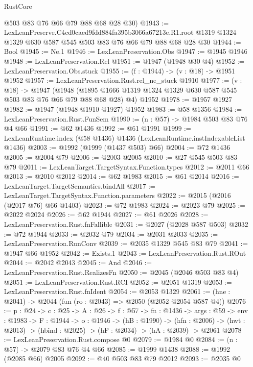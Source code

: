 \begin{lexlean}{RustCore}
\begin{coremodule}
      @503
      @83
      @76
      @66
      @79
      @88
      @68
      @28
      @30)
@1943 := LexLeanPreserve.C4cd0caed9fdd884fa395b3066a67213e.R1.root
    @1319
    @1324
    @1329
    @630
    @587
    @545
    @503
    @83
    @76
    @66
    @79
    @88
    @68
    @28
    @30
@1944 := Bool
@1945 := Ne.{1}
@1946 := LexLeanPreservation.Obs
@1947 := @1945 @1946
@1948 := LexLeanPreservation.Rel
@1951 := @1947 (@1948 @30 @4)
@1952 := LexLeanPreservation.Obs.stuck
@1955 := (f : @1944) -> (v : @18) -> @1951 @1952
@1957 := LexLeanPreservation.Rust.rel_ne_stuck @1910
@1977 := (v : @18) ->
  @1947
    (@1948 (@1895 @1666 @1319 @1324 @1329 @630 @587 @545 @503 @83 @76 @66 @79 @88 @68 @28) @4)
    @1952
@1978 := @1957 @1927
@1982 := @1947 (@1948 @1910 @1927) @1952
@1983 := @58 @1356
@1984 := LexLeanPreservation.Rust.FunSem
@1990 := (n : @57) -> @1984 @503 @83 @76 @4 @66
@1991 := @62 @1436
@1992 := @61 @1991
@1999 := LexLeanRuntime.index (@58 @1436) @1436 (LexLeanRuntime.instIndexableList @1436)
@2003 := @1992 (@1999 (@1437 @503) @66)
@2004 := @72 @1436
@2005 := @2004 @79
@2006 := @2003 @2005
@2010 := @27 @545 @503 @83 @79
@2011 := LexLeanTarget.TargetSyntax.Function.types
@2012 := @2011 @66
@2013 := @2010 @2012
@2014 := @62 @1983
@2015 := @61 @2014
@2016 := LexLeanTarget.TargetSemantics.bindAll
@2017 := LexLeanTarget.TargetSyntax.Function.parameters
@2022 := @2015 (@2016 (@2017 @76) @66 @1403)
@2023 := @72 @1983
@2024 := @2023 @79
@2025 := @2022 @2024
@2026 := @62 @1944
@2027 := @61 @2026
@2028 := LexLeanPreservation.Rust.fnFallible
@2031 := @2027 (@2028 @587 @503)
@2032 := @72 @1944
@2033 := @2032 @79
@2034 := @2031 @2033
@2035 := LexLeanPreservation.RunConv
@2039 := @2035 @1329 @545 @83 @79
@2041 := @1947 @66 @1952
@2042 := Exists.{1}
@2043 := LexLeanPreservation.Rust.ROut
@2044 := @2042 @2043
@2045 := And
@2046 := LexLeanPreservation.Rust.RealizesFn
@2050 := @2045 (@2046 @503 @83 @4)
@2051 := LexLeanPreservation.Rust.RCI
@2052 := @2051 @1319
@2053 := LexLeanPreservation.Rust.fnIdent
@2054 := @2053 @1329
@2061 := (hne : @2041) -> @2044 (fun (ro : @2043) => @2050 (@2052 @2054 @587 @4))
@2076 := {p : @24} ->
  {c : @25} ->
  {A : @26} ->
  {f : @57} ->
  {fn : @1436} ->
  {args : @59} ->
  {env : @1983} ->
  {F : @1944} ->
  {o : @1946} ->
  (hB : @1990) ->
  (hfn : @2006) -> (hwt : @2013) -> (hbind : @2025) -> (hF : @2034) -> (hA : @2039) -> @2061
@2078 := LexLeanPreservation.Rust.compose @0
@2079 := @1984 @0
@2084 := (n : @57) -> @2079 @83 @76 @4 @66
@2085 := @1999 @1438
@2088 := @1992 (@2085 @66) @2005
@2092 := @40 @503 @83 @79 @2012
@2093 := @2035 @0

\end{coremodule}
\end{lexlean}
